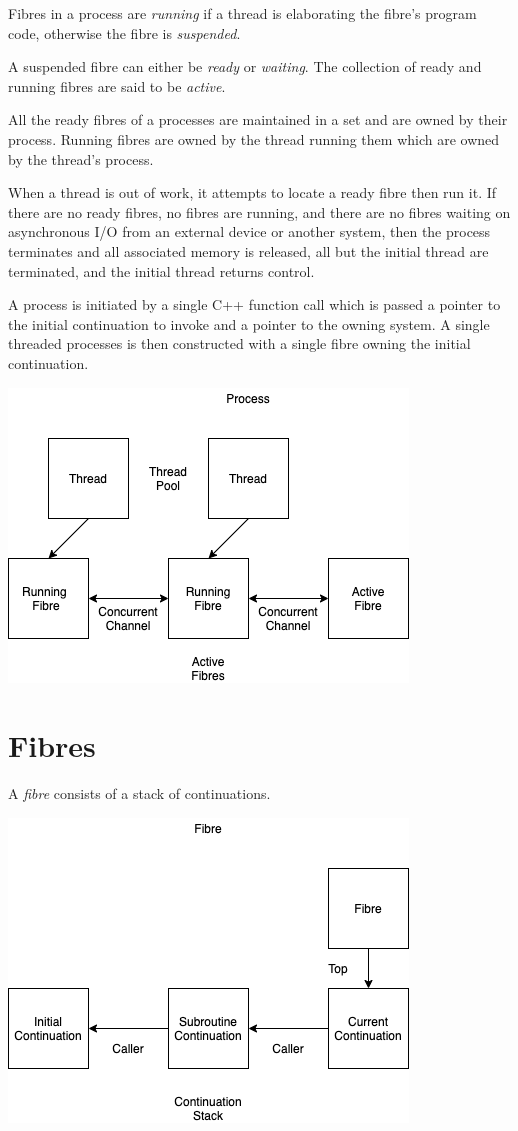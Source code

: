\documentclass[oneside]{book}
\begin{document}
Fibres in a process are {\em running} if a thread is elaborating the
fibre's program code, otherwise the fibre is {\em suspended}. 

A suspended fibre can either be {\em ready} or {\em waiting}.
The collection of ready and running fibres are said to be {\em active}.

All the ready fibres of a processes are maintained in a set and
are owned by their process. Running fibres are owned by the thread
running them which are owned by the thread's process.

When a thread is out of work, it attempts to locate a 
ready fibre then run it. If there are no ready fibres,
no fibres are running, and there are no fibres waiting on
asynchronous I/O from an external device or another system,
then the process terminates and all associated memory is released,
all but the initial thread are terminated, and the initial thread
returns control.

A process is initiated by a single C++ function call
which is passed a pointer to the initial continuation to invoke
and a pointer to the owning system. A single threaded processes
is then constructed with a single fibre owning the initial 
continuation.

\includegraphics{../src/tex/process.png}


\section{Fibres}

A {\em fibre} consists of a stack of continuations.

\includegraphics{../src/tex/fibre.png}
\end{document}
